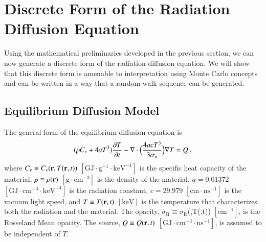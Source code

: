 \documentclass[preprint,12pt]{elsarticle}
\newcommand{\Cv}{\ensuremath{C_{v}}}
\newcommand{\ros}{\ensuremath{\sigma_{\scriptscriptstyle\mathrm{R}}}}
\begin{document}
\section{Discrete Form of the Radiation Diffusion Equation}
\label{sec:discr-form-radi}

Using the mathematical preliminaries developed in the previous section, we can
now generate a discrete form of the radiation diffusion equation. We will show
that this discrete form is amenable to interpretation using Monte Carlo
concepts and can be written in a way that a random walk sequence can be
generated.

\subsection{Equilibrium Diffusion Model}

The general form of the equilibrium diffusion equation is \cite{morel_1996}
\begin{equation} 
  (\rho\Cv + 4aT^{3})\pder{T}{t} -
  \nabla\cdot{\Bigl(\frac{4acT^{3}}{3\ros}\Bigr)\grad{T}} = Q\:,
  \label{eq:eq-diff-T}
\end{equation}
where $\Cv\equiv\Cv(\ve{r},T(\ve{r},t))$
$[\text{GJ}\cdot\text{g}^{-1}\cdot\text{keV}^{-1}]$ is the specific heat
capacity of the material, $\rho\equiv\rho(\mathbf{r})$
$[\text{g}\cdot\text{cm}^{-3}]$ is the density of the material, $a=0.01372$
$[\text{GJ}\cdot\text{cm}^{-3}\cdot\text{keV}^{-4}]$ is the radiation
constant, $c=29.979$ $[\text{cm}\cdot\text{ns}^{-1}]$ is the vacuum light
speed, and $T\equiv T(\mathbf{r},t)$ $[\text{keV}]$ is the temperature that
characterizes both the radiation and the material.  The opacity,
$\ros\equiv\ros$(,T(,t)) $[\text{cm}^{-1}]$, is the Rosseland Mean
opacity.  The source, $Q\equiv Q(\mathbf{r},t)$
$[\text{GJ}\cdot\text{cm}^{-3}\cdot\text{ns}^{-1}]$, is assumed to be
independent of $T$.
\end{document}
